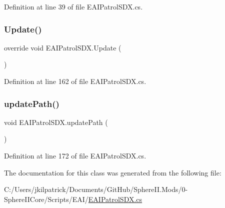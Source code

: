 Definition at line 39 of file E\+A\+I\+Patrol\+S\+D\+X.\+cs.

\mbox{\label{class_e_a_i_patrol_s_d_x_a2f5d21b77a20f5d874360967ab33bfe8}} 
\subsubsection{\texorpdfstring{Update()}{Update()}}
{\footnotesize\ttfamily override void E\+A\+I\+Patrol\+S\+D\+X.\+Update (\begin{DoxyParamCaption}{ }\end{DoxyParamCaption})}



Definition at line 162 of file E\+A\+I\+Patrol\+S\+D\+X.\+cs.

\mbox{\label{class_e_a_i_patrol_s_d_x_a5772708c95969db9a421148b7b3ac1e3}} 
\subsubsection{\texorpdfstring{updatePath()}{updatePath()}}
{\footnotesize\ttfamily void E\+A\+I\+Patrol\+S\+D\+X.\+update\+Path (\begin{DoxyParamCaption}{ }\end{DoxyParamCaption})}



Definition at line 172 of file E\+A\+I\+Patrol\+S\+D\+X.\+cs.



The documentation for this class was generated from the following file\+:\begin{DoxyCompactItemize}
\item 
C\+:/\+Users/jkilpatrick/\+Documents/\+Git\+Hub/\+Sphere\+I\+I.\+Mods/0-\/\+Sphere\+I\+I\+Core/\+Scripts/\+E\+A\+I/\mbox{\hyperlink{_e_a_i_patrol_s_d_x_8cs}{E\+A\+I\+Patrol\+S\+D\+X.\+cs}}\end{DoxyCompactItemize}
